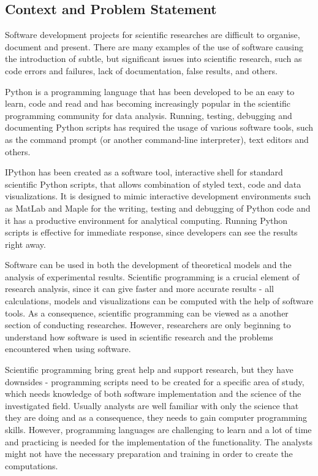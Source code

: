 \subsection{Context and Problem Statement}
\label{problem}

Software development projects for scientific researches are difficult to organise, document and present. There are many examples of the use of software causing the introduction of subtle, but significant issues into scientific research, such as code errors and failures, lack of documentation, false results, and others. 

Python is a programming language that has been developed to be an easy to learn, code and read and has becoming increasingly popular in the scientific programming community for data analysis. Running, testing, debugging and documenting Python scripts has required the usage of various software tools, such as the command prompt (or another command-line interpreter), text editors and others. 

IPython has been created as a software tool, interactive shell for standard scientific Python scripts, that allows combination of styled text, code and data visualizations.\cite{mckinney2012python} It is designed to mimic interactive development environments such as MatLab \cite{matLab} and Maple \cite{maple} for  the writing, testing and debugging of Python code and it has a productive environment for analytical computing. \cite{mckinney2012python} Running Python scripts is effective for immediate response, since developers can see the results right away.

Software can be used in both the development of theoretical models and the analysis of experimental results. Scientific programming is a crucial element of research analysis, since it can give faster and more accurate results - all calculations, models and visualizations can be computed with the help of software tools. As a consequence, scientific programming can be viewed as a another section of conducting researches.\cite{johansson2014introduction} However, researchers are only beginning to understand how software is used in scientific research and the problems encountered when using software.

Scientific programming bring great help and support research, but they have downsides - programming scripts need to be created for a specific area of study, which needs knowledge of both software implementation and the science of the investigated field. Usually analysts are well familiar with only the science that they are doing and as a consequence, they needs to gain computer programming skills. However, programming languages are challenging to learn and a lot of time and practicing is needed for the implementation of the functionality. The analysts might not have the necessary preparation and training in order to create the computations.  


